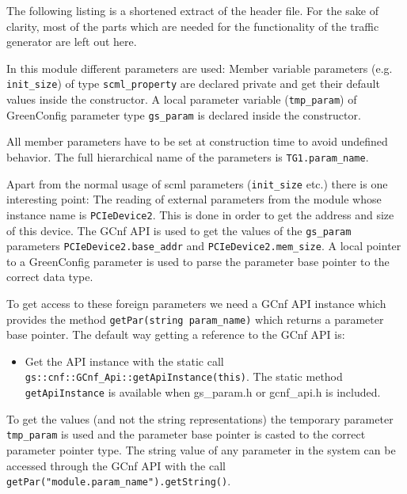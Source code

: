 The following listing is a shortened extract of the header file. For
the sake of clarity, most
of the parts which are needed for the functionality of the traffic
generator are left out here.

In this module different parameters are used: Member variable parameters (e.g. \lstinline|init_size|) of type \lstinline|scml_property| are declared private and get their default values inside the constructor. A local parameter variable (\lstinline|tmp_param|) of GreenConfig parameter type \lstinline|gs_param| is declared inside the constructor.

All member parameters have to be set at construction time to avoid undefined behavior. The full hierarchical name of the parameters is \lstinline|TG1.param_name|.

Apart from the normal usage of scml parameters
(\lstinline|init_size| etc.) there is one interesting point: The
reading of external parameters from the module whose instance name is
\lstinline|PCIeDevice2|. This is done in order to get the address and
size of this device.  The GCnf API is used to get the values of the
\lstinline|gs_param| parameters \lstinline|PCIeDevice2.base_addr|
and \lstinline|PCIeDevice2.mem_size|. A local pointer to a
GreenConfig parameter is used to parse the parameter base pointer to the
correct data type.

To get access to these foreign parameters we need a GCnf API instance which
provides the method \lstinline|getPar(string param_name)| which
returns a parameter base pointer. The default way getting a reference to the GCnf API
is:
\begin{itemize}
	\item Get the API instance with the static call \lstinline[language=TeX]|gs::cnf::GCnf_Api::getApiInstance(this)|. The static method \lstinline|getApiInstance| is available when gs\_param.h or gcnf\_api.h is included.
\end{itemize}

To get the values (and not the string representations) the temporary parameter \lstinline|tmp_param| is used and the parameter base pointer is casted to the correct parameter pointer type. The string value of any parameter in the system can be accessed through the GCnf API with the call \lstinline[language=TeX]|getPar("module.param_name").getString()|. 


